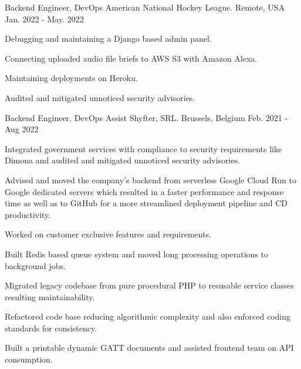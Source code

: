 \begin{cventries}
  \cventry
    {Backend Engineer, DevOps} %
    {American National Hockey League.} %
    {Remote, USA} %
    {Jan. 2022 - May. 2022} %
    {
      \begin{cvitems} %
        \item {Debugging and maintaining a Django based admin panel.}
        \item {Connecting uploaded audio file briefs to AWS S3 with Amazon Alexa.}
        \item {Maintaining deployments on Heroku.}
        \item {Audited and mitigated unnoticed security advisories.}
      \end{cvitems}
    }

  \cventry
    {Backend Engineer, DevOps Assist} %
    {Shyfter, SRL.} %
    {Brussels, Belgium} %
    {Feb. 2021 - Aug 2022} %
    {
      \begin{cvitems} %
        \item {Integrated government services with compliance to security requirements like Dimona and audited and mitigated unnoticed security advisories.}
        \item {Advised and moved the company's backend from serverless Google Cloud Run to Google dedicated servers which resulted in a faster performance and response time as well as to GitHub for a more streamlined deployment pipeline and CD productivity.}
        \item {Worked on customer exclusive features and requirements.}
        \item {Built Redis based queue system and moved long processing operations to background jobs.}
        \item {Migrated legacy codebase from pure procedural PHP to resusable service classes resulting maintainability.}
        \item {Refactored code base reducing algorithmic complexity and also enforced coding standards for consistency.}
        \item {Built a printable dynamic GATT documents and assisted frontend team on API consumption.}
      \end{cvitems}
    }


\end{cventries}
